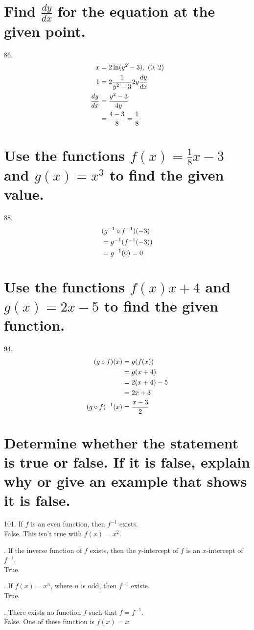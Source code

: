 \documentclass[11pt]{article}
\newcommand*{\vs}{\vspace{1cm}}
\newcommand*{\next}{\noindent}
\newcommand*{\set}{\setcounter{equation}{0}}
\begin{document}
\section{Find $\frac{dy}{dx}$ for the equation at the given point.}
86.\begin{align}
    \set
    x&=2\ln(y^2-3),\,\, (0,\, 2)\\
    1&=2\frac{1}{y^2-3}2y\frac{dy}{dx}\\
    \frac{dy}{dx}&=\frac{y^2-3}{4y}\\
    &=\frac{4-3}{8}=\frac{1}{8}
\end{align}

\section{Use the functions $f(x)=\frac{1}{8}x-3$ and $g(x)=x^3$ to find the given value.}
88.\begin{align}
    \set
    &(g^{-1}\circ f^{-1})(-3)\\
    &=g^{-1}(f^{-1}(-3))\\
    &=g^{-1}(0)=0
\end{align}

\section{Use the functions $f(x)x+4$ and $g(x)=2x-5$ to find the given function.}
94.\begin{align}
    \set
    (g\circ f)(x)&=g(f(x))\\
    &=g(x+4)\\
    &=2(x+4)-5\\
    &=2x+3\\
    (g\circ f)^{-1}(x)&=\frac{x-3}{2}
\end{align}

\section{Determine whether the
statement is true or false. If it is false, explain why or give an
example that shows it is false.}
101. If $f$ is an even function, then $f^{-1}$ exists.\\
\indent False. This isn't true with $f(x)=x^2$.

\vs\next
102. If the inverse function of $f$ exists, then the y-intercept of $f$ is an $x$-intercept of $f^{-1}$.\\
\indent True.

\vs\next
103. If $f(x)=x^n$, where $n$ is odd, then $f^{-1}$ exists.\\
\indent True.

\vs\next
104. There exists no function $f$ such that $f=f^{-1}$.\\
\indent False. One of these function is $f(x)=x$.
\end{document}
